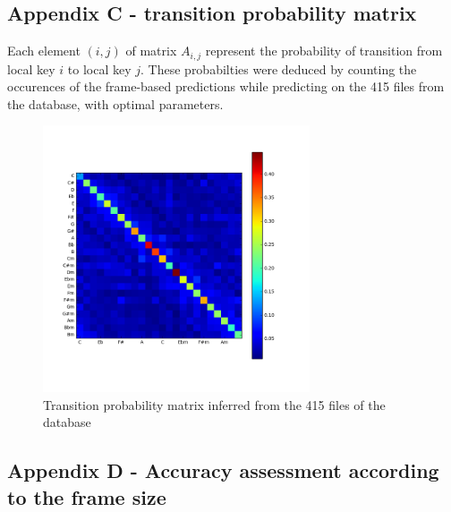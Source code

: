 \documentclass[letterpaper]{article}
\begin{document}
\subsection{Appendix C - transition probability matrix}

Each element $(i, j)$ of matrix $A_{i, j}$ represent the probability of transition from local key $i$ to local key $j$. These probabilties were deduced by counting the occurences of the frame-based predictions while predicting on the 415 files from the database, with optimal parameters.\\

\begin{figure}[h!]
\begin{center}
\includegraphics[width=3.1in,angle=0]{imgs/probs.png}
\caption{Transition probability matrix inferred from the 415 files of the database}
\label{}
\end{center}
\end{figure}

\subsection{Appendix D - Accuracy assessment according to the frame size}

\begin{table}
\vskip 0.25cm
\caption{Scores obtained using Lomb-Scargle and a Maximum Key-profile Correlation approach, without any overlay and
without taking the temporal aspect into account.}
\end{table}
\end{document}
